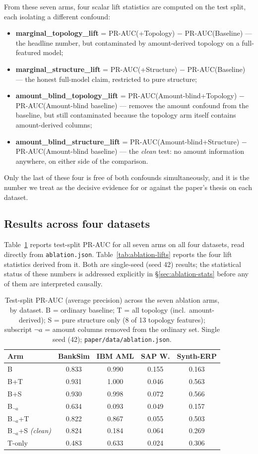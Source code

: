 From these seven arms, four scalar lift statistics are computed on the test split, each isolating a different confound:
\begin{itemize}
  \item \textbf{marginal\_topology\_lift} = PR-AUC(+Topology) $-$ PR-AUC(Baseline) — the headline number, but contaminated by amount-derived topology on a full-featured model;
  \item \textbf{marginal\_structure\_lift} = PR-AUC(+Structure) $-$ PR-AUC(Baseline) — the honest full-model claim, restricted to pure structure;
  \item \textbf{amount\_blind\_topology\_lift} = PR-AUC(Amount-blind+Topology) $-$ PR-AUC(Amount-blind baseline) — removes the amount confound from the baseline, but still contaminated because the topology arm itself contains amount-derived columns;
  \item \textbf{amount\_blind\_structure\_lift} = PR-AUC(Amount-blind+Structure) $-$ PR-AUC(Amount-blind baseline) — the \emph{clean} test: no amount information anywhere, on either side of the comparison.
\end{itemize}
Only the last of these four is free of both confounds simultaneously, and it is the number we treat as the decisive evidence for or against the paper's thesis on each dataset.

\subsection{Results across four datasets}
Table~\ref{tab:ablation-arms} reports test-split PR-AUC for all seven arms on all four datasets, read directly from \texttt{ablation.json}. Table~\ref{tab:ablation-lifts} reports the four lift statistics derived from it. Both are single-seed (seed 42) results; the statistical status of these numbers is addressed explicitly in \S\ref{sec:ablation-stats} before any of them are interpreted causally.

\begin{table}[t]
\centering
\caption{Test-split PR-AUC (average precision) across the seven ablation arms, by dataset. B = ordinary baseline; T = all topology (incl.\ amount-derived); S = pure structure only (8 of 13 topology features); subscript $\neg a$ = amount columns removed from the ordinary set. Single seed (42); \texttt{paper/data/ablation.json}.}
\label{tab:ablation-arms}
\small
\begin{tabular}{lcccc}
\toprule
Arm & BankSim & IBM AML & SAP W. & Synth-ERP \\
\midrule
B & 0.833 & 0.990 & 0.155 & 0.163 \\
B+T & 0.931 & 1.000 & 0.046 & 0.563 \\
B+S & 0.930 & 0.998 & 0.072 & 0.566 \\
B$_{\neg a}$ & 0.634 & 0.093 & 0.049 & 0.157 \\
B$_{\neg a}$+T & 0.822 & 0.867 & 0.055 & 0.503 \\
B$_{\neg a}$+S \emph{(clean)} & 0.824 & 0.184 & 0.064 & 0.269 \\
T-only & 0.483 & 0.633 & 0.024 & 0.306 \\
\bottomrule
\end{tabular}
\end{table}

